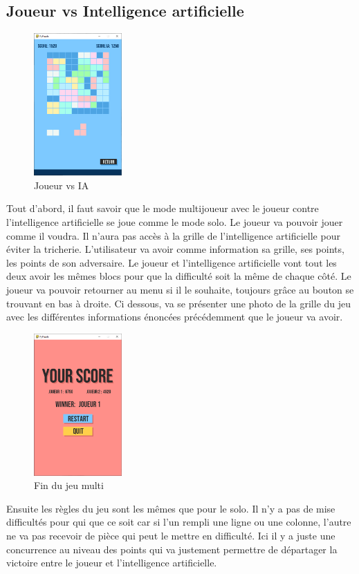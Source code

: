 \documentclass[a4paper]{report}
\begin{document}
\subsection{Joueur vs Intelligence artificielle}
\begin{figure}
    \centering
    \includegraphics[width=0.3\textwidth, trim=0pt 0pt 0pt 30pt]{images/3-playwithai.png}
    \caption{Joueur vs IA}
    \vspace{-10pt}
\end{figure}
Tout d'abord, il faut savoir que le mode multijoueur avec le joueur contre l'intelligence artificielle se joue comme le mode solo. Le joueur va pouvoir jouer comme il voudra. Il n'aura pas accès à la grille de l'intelligence artificielle pour éviter la tricherie. L'utilisateur va avoir comme information sa grille, ses points, les points de son adversaire. Le joueur et l'intelligence artificielle vont tout les deux avoir les mêmes blocs pour que la difficulté soit la même de chaque côté. Le joueur va pouvoir retourner au menu si il le souhaite, toujours grâce au bouton se trouvant en bas à droite. Ci dessous, va se présenter une photo de la grille du jeu avec les différentes informations énoncées précédemment que le joueur va avoir.\\

\begin{figure}
    \centering
    \includegraphics[width=0.3\textwidth, trim=0pt 0pt 0pt 130pt]{images/4-endmulti.png}
    \caption{Fin du jeu multi}
\end{figure}
Ensuite les règles du jeu sont les mêmes que pour le solo. Il n'y a pas de mise difficultés pour qui que ce soit car si l'un rempli une ligne ou une colonne, l'autre ne va pas recevoir de pièce qui peut le mettre en difficulté. Ici il y a juste une concurrence au niveau des points qui va justement permettre de départager la victoire entre le joueur et l'intelligence artificielle.\\
\end{document}
